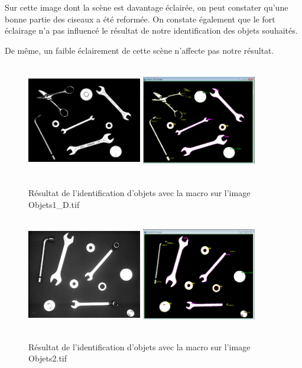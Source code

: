 \documentclass{scrreprt}
\begin{document}
Sur cette image dont la scène est davantage éclairée, on peut constater qu'une bonne partie
des ciseaux a été reformée. On constate également que le fort éclairage n'a pas influencé 
le résultat de notre identification des objets souhaités. 

\newpage
De même, un faible éclairement de cette scène n'affecte pas notre résultat.

\begin{figure}[!h]
\centering
\includegraphics[width=5cm, height=5cm]{images/objet1Do.png}\hfill
\includegraphics[width=5cm, height=5cm]{images/objet1D.png}
\caption{Résultat de l'identification d'objets avec la macro sur l'image Objets1_D.tif}
\end{figure}


\begin{figure}[!h]
\centering
\includegraphics[width=5cm, height=5cm]{images/objet2o.png}\hfill
\includegraphics[width=5cm, height=5cm]{images/objet2.png}
\caption{Résultat de l'identification d'objets avec la macro sur l'image Objets2.tif}
\end{figure}
\end{document}

